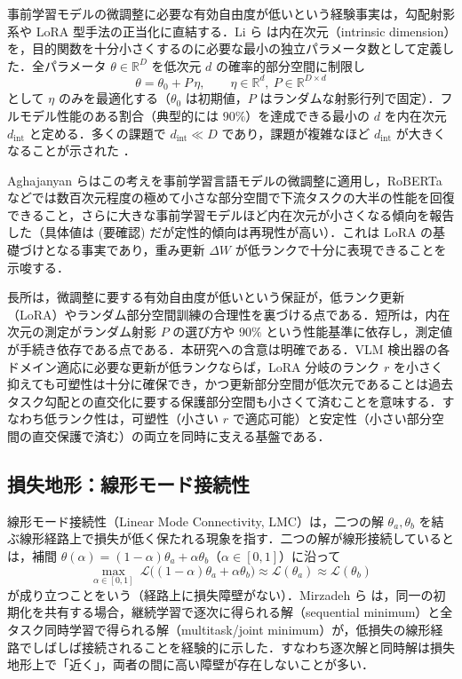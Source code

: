 事前学習モデルの微調整に必要な有効自由度が低いという経験事実は，勾配射影系や LoRA 型手法の正当化に直結する．Li ら \cite{intrinsicdim} は内在次元（intrinsic dimension）を，目的関数を十分小さくするのに必要な最小の独立パラメータ数として定義した．全パラメータ $\theta\in\mathbb{R}^D$ を低次元 $d$ の確率的部分空間に制限し
\begin{equation}
\theta=\theta_0+P\,\eta,\qquad \eta\in\mathbb{R}^d,\ P\in\mathbb{R}^{D\times d}
\end{equation}
として $\eta$ のみを最適化する（$\theta_0$ は初期値，$P$ はランダムな射影行列で固定）．フルモデル性能のある割合（典型的には $90\%$）を達成できる最小の $d$ を内在次元 $d_{\mathrm{int}}$ と定める．多くの課題で $d_{\mathrm{int}}\ll D$ であり，課題が複雑なほど $d_{\mathrm{int}}$ が大きくなることが示された \cite{intrinsicdim}．

Aghajanyan らはこの考えを事前学習言語モデルの微調整に適用し，RoBERTa などでは数百次元程度の極めて小さな部分空間で下流タスクの大半の性能を回復できること，さらに大きな事前学習モデルほど内在次元が小さくなる傾向を報告した（具体値は (要確認) だが定性的傾向は再現性が高い）．これは LoRA の基礎づけとなる事実であり，重み更新 $\Delta W$ が低ランクで十分に表現できることを示唆する．

長所は，微調整に要する有効自由度が低いという保証が，低ランク更新（LoRA）やランダム部分空間訓練の合理性を裏づける点である．短所は，内在次元の測定がランダム射影 $P$ の選び方や $90\%$ という性能基準に依存し，測定値が手続き依存である点である．本研究への含意は明確である．VLM 検出器の各ドメイン適応に必要な更新が低ランクならば，LoRA 分岐のランク $r$ を小さく抑えても可塑性は十分に確保でき，かつ更新部分空間が低次元であることは過去タスク勾配との直交化に要する保護部分空間も小さくて済むことを意味する．すなわち低ランク性は，可塑性（小さい $r$ で適応可能）と安定性（小さい部分空間の直交保護で済む）の両立を同時に支える基盤である．

\subsection{損失地形：線形モード接続性}

線形モード接続性（Linear Mode Connectivity, LMC）は，二つの解 $\theta_a,\theta_b$ を結ぶ線形経路上で損失が低く保たれる現象を指す．二つの解が線形接続しているとは，補間 $\theta(\alpha)=(1-\alpha)\theta_a+\alpha\theta_b$（$\alpha\in[0,1]$）に沿って
\begin{equation}
\max_{\alpha\in[0,1]}\ \mathcal{L}\bigl((1-\alpha)\theta_a+\alpha\theta_b\bigr)\approx \mathcal{L}(\theta_a)\approx \mathcal{L}(\theta_b)
\end{equation}
が成り立つことをいう（経路上に損失障壁がない）．Mirzadeh ら \cite{lmc} は，同一の初期化を共有する場合，継続学習で逐次に得られる解（sequential minimum）と全タスク同時学習で得られる解（multitask/joint minimum）が，低損失の線形経路でしばしば接続されることを経験的に示した．すなわち逐次解と同時解は損失地形上で「近く」，両者の間に高い障壁が存在しないことが多い．


